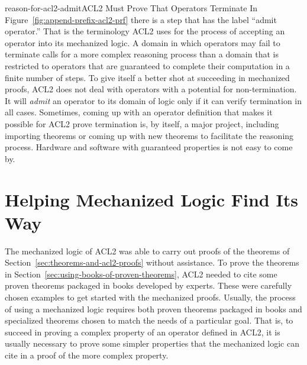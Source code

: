 \begin{aside}{reason-for-acl2-admit}{ACL2 Must Prove That Operators Terminate}
In Figure~\ref{fig:append-prefix-acl2-prf}
there is a step that has the label ``admit operator.''
That is the terminology ACL2 uses for the process of accepting
an operator into its mechanized logic.
A domain in which operators may fail to terminate
calls for a more complex reasoning process than a domain that is
restricted to operators that are guaranteed to complete their
computation in a finite number of steps.
To give itself a better shot at succeeding in mechanized proofs,
ACL2 does not deal with operators with a potential for non-termination.
It will \emph{admit} an operator to its domain of logic
only if it can verify termination in all cases.
Sometimes, coming up with an operator definition that makes
it possible for ACL2 prove termination is, by itself,
a major project, including importing theorems or coming up with new
theorems to facilitate the reasoning process.
Hardware and software with guaranteed properties is not easy to come
by.
\end{aside}

\begin{exercises}




\end{exercises}

\section{Helping Mechanized Logic Find Its Way}
\label{sec:lemmas}

The mechanized logic of ACL2 was able to carry out proofs of
the theorems of Section~\ref{sec:theorems-and-acl2-proofs} without assistance.
To prove the theorems in Section~\ref{sec:using-books-of-proven-theorems},
ACL2 needed to cite some proven theorems packaged in books
developed by experts.
These were carefully chosen examples to get started with
the mechanized proofs.
Usually, the process of using a mechanized logic requires
both proven theorems packaged in books
and specialized theorems chosen to match the
needs of a particular goal.
That is, to succeed in proving a complex property of
an operator defined in ACL2,
it is usually necessary to prove
some simpler properties that the mechanized
logic can cite in a proof of the more complex property.

